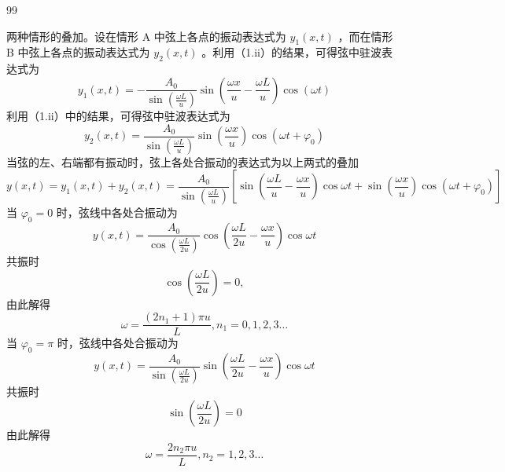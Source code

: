 \begin{solution}{99}
\begin{subsolution}
        两种情形的叠加。设在情形 A 中弦上各点的振动表达式为 $y_{1}(x,t)$ ，而在情形 B 中弦上各点的振动表达式为 $y_{2}(x,t)$ 。利用（1.ii）的结果，可得弦中驻波表达式为
        \begin{equation*}
            y _ {1} (x, t) = - \frac {A _ {0}}{\sin \left(\frac {\omega L}{u}\right)} \sin \left(\frac {\omega x}{u} - \frac {\omega L}{u}\right) \cos (\omega t)
        \end{equation*}
        利用（1.ii）中的结果，可得弦中驻波表达式为
        \begin{equation}
            y _ {2} (x, t) = \frac {A _ {0}}{\sin \left(\frac {\omega L}{u}\right)} \sin \left(\frac {\omega x}{u}\right) \cos (\omega t + \varphi_ {0})
            \label{eq:15.p99}
        \end{equation}
        当弦的左、右端都有振动时，弦上各处合振动的表达式为以上两式的叠加
        \begin{equation*}
            y (x, t) = y _ {1} (x, t) + y _ {2} (x, t) = \frac {A _ {0}}{\sin \left(\frac {\omega L}{u}\right)} \left[ \sin \left(\frac {\omega L}{u} - \frac {\omega x}{u}\right) \cos \omega t + \sin \left(\frac {\omega x}{u}\right) \cos (\omega t + \varphi_ {0}) \right]
        \end{equation*}
        当 $\varphi_0 = 0$ 时，弦线中各处合振动为
        \begin{equation}
            y (x, t) = \frac {A _ {0}}{\cos \left(\frac {\omega L}{2 u}\right)} \cos \left(\frac {\omega L}{2 u} - \frac {\omega x}{u}\right) \cos \omega t
            \label{eq:16.p99}
        \end{equation}
        共振时
        \begin{equation*}
            \cos \left(\frac {\omega L}{2 u}\right) = 0,
        \end{equation*}
        由此解得
        \begin{equation}
            \omega = \frac {(2 n _ {1} + 1) \pi u}{L}, n _ {1} = 0, 1, 2, 3 \dots
            \label{eq:17.p99}
        \end{equation}
        当 $\varphi_0 = \pi$ 时，弦线中各处合振动为
        \begin{equation}
            y (x, t) = \frac {A _ {0}}{\sin \left(\frac {\omega L}{2 u}\right)} \sin \left(\frac {\omega L}{2 u} - \frac {\omega x}{u}\right) \cos \omega t
            \label{eq:18.p99}
        \end{equation}
        共振时
        \begin{equation*}
            \sin \left(\frac {\omega L}{2 u}\right) = 0
        \end{equation*}
        由此解得
        \begin{equation}
            \omega = \frac {2 n _ {2} \pi u}{L}, n _ {2} = 1, 2, 3 \dots
            \label{eq:19.p99}
        \end{equation}
    \end{subsolution}
\end{solution}